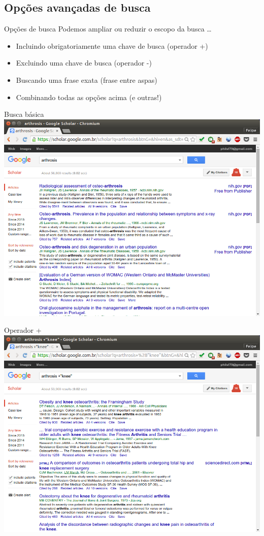 \documentclass{beamer}
\begin{document}
\subsection[{\em Advanced}]{Opções avançadas de busca}

\begin{frame}{Opções de busca}
  Podemos ampliar ou reduzir o escopo da busca \ldots
  \begin{itemize}
    \footnotesize
  \item Incluindo obrigatoriamente uma chave de busca (operador +)
  \item Excluindo uma chave de busca (operador -)
  \item Buscando uma frase exata (frase entre aspas)
  \item Combinando todas as opções acima (e outras!)
  \end{itemize}
\end{frame}

\begin{frame}{Busca básica}
  \centering
  \includegraphics[height=.85\textheight]{Busca/google-fu-basico}
\end{frame}

\begin{frame}{Operador +}
  \centering
  \includegraphics[height=.85\textheight]{Busca/google-fu-plus}
\end{frame}
\end{document}
